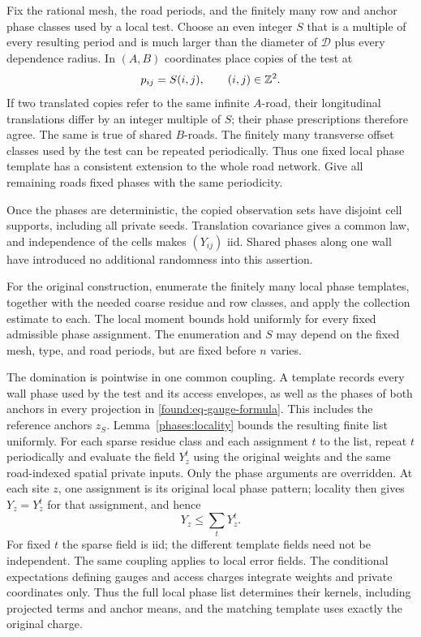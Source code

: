 Fix the rational mesh, the road periods, and the finitely many row and
anchor phase classes used by a local test.  Choose an even integer $S$ that is
a multiple of every resulting period and is much larger than the diameter
of $\mathcal D$ plus every dependence radius.  In $(A,B)$ coordinates
place copies of the test at
\[
                        p_{ij}=S(i,j),\qquad (i,j)\in\mathbb Z^2.
\]
If two translated copies refer to the same infinite $A$-road, their
longitudinal translations differ by an integer multiple of $S$; their
phase prescriptions therefore agree.  The same is true of shared
$B$-roads.  The finitely many transverse offset classes used by the test
can be repeated periodically.  Thus one fixed local phase template has a
consistent extension to the whole road network.  Give all remaining
roads fixed phases with the same periodicity.

Once the phases are deterministic, the copied observation sets have
disjoint cell supports, including all private seeds.  Translation
covariance gives a common law, and independence of the cells makes
$(Y_{ij})$ iid.  Shared phases along one wall have introduced no additional
randomness into this assertion.

For the original construction, enumerate the finitely many local phase
templates, together with the needed coarse residue and row classes, and
apply the collection estimate to each.  The local moment bounds hold
uniformly for every fixed admissible phase assignment.  The enumeration
and $S$ may depend on the fixed mesh, type, and road periods, but are
fixed before $n$ varies.

The domination is pointwise in one common coupling.  A template records
every wall phase used by the test and its access envelopes, as well as
the phases of both anchors in every projection in
\eqref{found:eq-gauge-formula}.  This includes the reference anchors
$z_S$.  Lemma~\ref{phases:locality} bounds the resulting finite list
uniformly.
For each sparse residue class and each assignment $t$ to the list,
repeat $t$ periodically and evaluate the field $Y_z^t$ using the
original weights and the same road-indexed spatial private inputs.
Only the phase arguments are overridden. At each site $z$, one
assignment is its original local phase pattern; locality then gives
$Y_z=Y_z^t$ for that assignment, and hence
\[
                         Y_z\le\sum_tY_z^t.
\]
For fixed $t$ the sparse field is iid; the different template fields
need not be independent. The same coupling applies to local error
fields. The conditional expectations defining gauges and access charges
integrate weights and private coordinates only. Thus the full local phase
list determines their kernels, including projected terms and anchor
means, and the matching template uses exactly the original charge.


